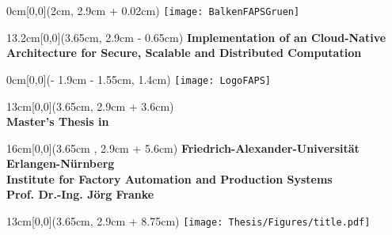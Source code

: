 \newpage
\thispagestyle{empty}




\begin{textblock*}{0cm}[0,0](2cm, 2.9cm + 0.02cm)
	\texttt{[image: BalkenFAPSGruen]}
\end{textblock*}

\begin{textblock*}{13.2cm}[0,0](3.65cm, 2.9cm - 0.65cm)
	\singlespacing
        \Large \bfseries Implementation of an Cloud-Native Architecture for Secure, Scalable and Distributed Computation

\end{textblock*}

\begin{textblock*}{0cm}[0,0](\paperwidth - 1.9cm - 1.55cm, 1.4cm)
	\texttt{[image: LogoFAPS]}
\end{textblock*}

\begin{textblock*}{13cm}[0,0](3.65cm, 2.9cm + 3.6cm)
	\singlespacing
	\bfseries \\ 
	Master’s Thesis in \STUDIENGANG
\end{textblock*}

\begin{textblock*}{16cm}[0,0](3.65cm , 2.9cm + 5.6cm)
	\singlespacing
	\bfseries
	Friedrich-Alexander-Universität Erlangen-Nürnberg\\
	Institute for Factory Automation and Production Systems\\
	Prof. Dr.-Ing. Jörg Franke
\end{textblock*}

\begin{textblock*}{13cm}[0,0](3.65cm, 2.9cm + 8.75cm)
	\texttt{[image: Thesis/Figures/title.pdf]}
\end{textblock*}


